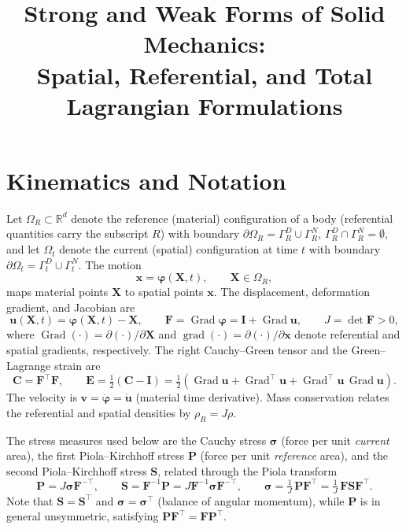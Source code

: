\documentclass[11pt]{article}
\title{Strong and Weak Forms of Solid Mechanics:\\
Spatial, Referential, and Total Lagrangian Formulations}
\author{}
\date{}
\newcommand{\grad}{\operatorname{grad}}     %
\newcommand{\Grad}{\operatorname{Grad}}     %
\newcommand{\bx}{\bm{x}}
\newcommand{\bX}{\bm{X}}
\newcommand{\bu}{\bm{u}}
\newcommand{\bv}{\bm{v}}
\newcommand{\bsig}{\bm{\sigma}}
\newcommand{\bP}{\bm{P}}
\newcommand{\bS}{\bm{S}}
\newcommand{\bF}{\bm{F}}
\newcommand{\bC}{\bm{C}}
\newcommand{\bE}{\bm{E}}
\newcommand{\bI}{\bm{I}}
\newcommand{\bphi}{\bm{\varphi}}
\begin{document}
\maketitle

\section{Kinematics and Notation}

Let $\Omega_R \subset \mathbb{R}^d$ denote the reference (material)
configuration of a body (referential quantities carry the subscript $R$)
with boundary $\partial\Omega_R = \Gamma_R^D \cup
\Gamma_R^N$, $\Gamma_R^D \cap \Gamma_R^N = \emptyset$, and let $\Omega_t$
denote the current (spatial) configuration at time $t$ with boundary
$\partial\Omega_t = \Gamma_t^D \cup \Gamma_t^N$.  The motion
\begin{equation}
  \bx = \bphi(\bX, t), \qquad \bX \in \Omega_R,
\end{equation}
maps material points $\bX$ to spatial points $\bx$.  The displacement,
deformation gradient, and Jacobian are
\begin{equation}
  \bu(\bX,t) = \bphi(\bX,t) - \bX,
  \qquad
  \bF = \Grad \bphi = \bI + \Grad \bu,
  \qquad
  J = \det \bF > 0,
\end{equation}
where $\Grad(\cdot) = \partial(\cdot)/\partial\bX$ and
$\grad(\cdot) = \partial(\cdot)/\partial\bx$ denote referential and spatial
gradients, respectively.  The right Cauchy--Green tensor and the
Green--Lagrange strain are
\begin{equation}
  \bC = \bF^{\!\top}\bF,
  \qquad
  \bE = \tfrac{1}{2}\left(\bC - \bI\right)
      = \tfrac{1}{2}\left(\Grad\bu + \Grad^{\!\top}\bu
        + \Grad^{\!\top}\bu \, \Grad\bu\right).
\end{equation}
The velocity is $\bv = \dot{\bphi} = \dot{\bu}$ (material time derivative).
Mass conservation relates the referential and spatial densities by
$\rho_R = J\rho$.

The stress measures used below are the Cauchy stress $\bsig$ (force per unit
\emph{current} area), the first Piola--Kirchhoff stress $\bP$ (force per unit
\emph{reference} area), and the second Piola--Kirchhoff stress $\bS$, related
through the Piola transform
\begin{equation}
  \bP = J \bsig \bF^{-\top},
  \qquad
  \bS = \bF^{-1}\bP = J \bF^{-1} \bsig \bF^{-\top},
  \qquad
  \bsig = \tfrac{1}{J}\,\bP\bF^{\!\top} = \tfrac{1}{J}\,\bF\bS\bF^{\!\top}.
  \label{eq:piola}
\end{equation}
Note that $\bS = \bS^{\top}$ and $\bsig = \bsig^{\top}$ (balance of angular
momentum), while $\bP$ is in general unsymmetric, satisfying
$\bP\bF^{\!\top} = \bF\bP^{\top}$.
\end{document}
